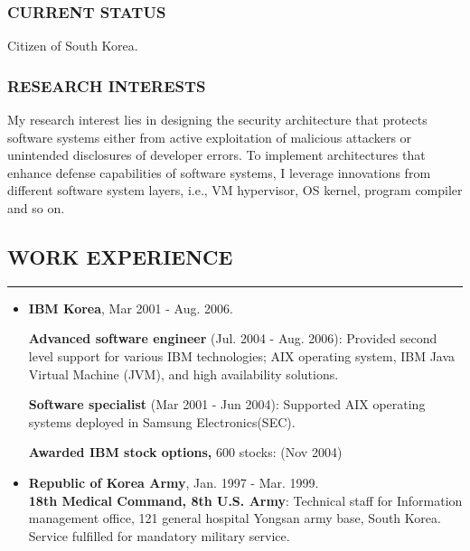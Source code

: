 \documentclass[10pt,a4]{article}
\begin{document}
\begin{small}
\subsubsection*{CURRENT STATUS}
\begin{list}{}{}
\item Citizen of South Korea.
\end{list}

\subsubsection*{RESEARCH INTERESTS}

\begin{list}{}{}
\item My research interest lies in designing the security architecture that
        protects software systems either from active exploitation of malicious
        attackers or unintended disclosures of developer errors. To implement
        architectures that enhance defense capabilities of software systems, I
        leverage innovations from different software system layers, i.e., VM
        hypervisor, OS kernel, program compiler and so on.  
%
\end{list}

\subsection*{WORK EXPERIENCE}
\hrule
\vspace{0.2cm}
\begin{itemize}
\item {\bf IBM Korea},  Mar 2001 - Aug. 2006. 

  {\bf Advanced software engineer} (Jul. 2004 - Aug. 2006): Provided second
  level support for various IBM technologies; AIX operating system, IBM Java
  Virtual Machine (JVM), and high availability solutions.

  {\bf Software specialist} (Mar 2001 - Jun 2004): Supported AIX operating
  systems deployed in Samsung Electronics(SEC).

  {\bf Awarded IBM stock options,} 600 stocks: (Nov 2004) 
  \\

\item {\bf Republic of Korea Army}, Jan. 1997 - Mar. 1999. \\
        {\bf 18th Medical Command, 8th U.S. Army}: Technical staff for
        Information management office, 121 general hospital Yongsan army base,
        South Korea. Service fulfilled for mandatory military service.


\end{itemize}
\end{small}
\end{document}
